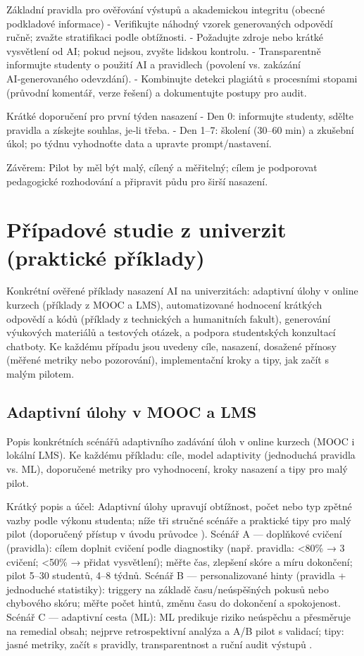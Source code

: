 \documentclass{report}%
\begin{document}
Základní pravidla pro ověřování výstupů a akademickou integritu (obecné podkladové informace)
- Verifikujte náhodný vzorek generovaných odpovědí ručně; zvažte stratifikaci podle obtížnosti.
- Požadujte zdroje nebo krátké vysvětlení od AI; pokud nejsou, zvyšte lidskou kontrolu.
- Transparentně informujte studenty o použití AI a pravidlech (povolení vs. zakázání AI‑generovaného odevzdání).
- Kombinujte detekci plagiátů s procesními stopami (průvodní komentář, verze řešení) a dokumentujte postupy pro audit.

Krátké doporučení pro první týden nasazení
- Den 0: informujte studenty, sdělte pravidla a získejte souhlas, je‑li třeba.
- Den 1–7: školení (30–60 min) a zkušební úkol; po týdnu vyhodnoťte data a upravte prompt/nastavení.

Závěrem: Pilot by měl být malý, cílený a měřitelný; cílem je podporovat pedagogické rozhodování a připravit půdu pro širší nasazení.%

%
\chapter{Případové studie z univerzit (praktické příklady)}%
Konkrétní ověřené příklady nasazení AI na univerzitách: adaptivní úlohy v online kurzech (příklady z MOOC a LMS), automatizované hodnocení krátkých odpovědí a kódů (příklady z technických a humanitních fakult), generování výukových materiálů a testových otázek, a podpora studentských konzultací chatboty. Ke každému případu jsou uvedeny cíle, nasazení, dosažené přínosy (měřené metriky nebo pozorování), implementační kroky a tipy, jak začít s malým pilotem.%
\section{Adaptivní úlohy v MOOC a LMS}%
Popis konkrétních scénářů adaptivního zadávání úloh v online kurzech (MOOC i lokální LMS). Ke každému příkladu: cíle, model adaptivity (jednoduchá pravidla vs. ML), doporučené metriky pro vyhodnocení, kroky nasazení a tipy pro malý pilot.%


%
Krátký popis a účel: Adaptivní úlohy upravují obtížnost, počet nebo typ zpětné vazby podle výkonu studenta; níže tři stručné scénáře a praktické tipy pro malý pilot (doporučený přístup v úvodu průvodce \cite{1}).  
Scénář A — doplňkové cvičení (pravidla): cílem doplnit cvičení podle diagnostiky (např. pravidla: <80\% → 3 cvičení; <50\% → přidat vysvětlení); měřte čas, zlepšení skóre a míru dokončení; pilot 5--30 studentů, 4--8 týdnů.  
Scénář B — personalizované hinty (pravidla + jednoduché statistiky): triggery na základě času/neúspěšných pokusů nebo chybového skóru; měřte počet hintů, změnu času do dokončení a spokojenost.  
Scénář C — adaptivní cesta (ML): ML predikuje riziko neúspěchu a přesměruje na remedial obsah; nejprve retrospektivní analýza a A/B pilot s validací; tipy: jasné metriky, začít s pravidly, transparentnost a ruční audit výstupů \cite{1}.%
\end{document}
